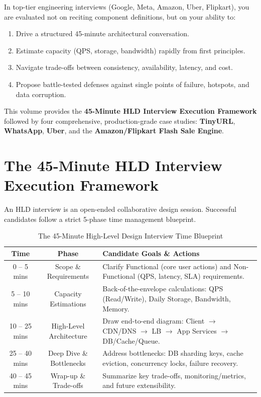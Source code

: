 \documentclass[10pt,journal,compsoc,onecolumn]{IEEEtran}
\begin{document}
In top-tier engineering interviews (Google, Meta, Amazon, Uber, Flipkart), you are evaluated not on reciting component definitions, but on your ability to:
\begin{enumerate}
    \item Drive a structured 45-minute architectural conversation.
    \item Estimate capacity (QPS, storage, bandwidth) rapidly from first principles.
    \item Navigate trade-offs between consistency, availability, latency, and cost.
    \item Propose battle-tested defenses against single points of failure, hotspots, and data corruption.
\end{enumerate}

This volume provides the \textbf{45-Minute HLD Interview Execution Framework} followed by four comprehensive, production-grade case studies: \textbf{TinyURL}, \textbf{WhatsApp}, \textbf{Uber}, and the \textbf{Amazon/Flipkart Flash Sale Engine}.

\section{The 45-Minute HLD Interview Execution Framework}
\label{sec:hld_framework}

An HLD interview is an open-ended collaborative design session. Successful candidates follow a strict 5-phase time management blueprint.

\begin{table}[htbp]
\caption{The 45-Minute High-Level Design Interview Time Blueprint}
\label{tab:hld_blueprint}
\centering
\begin{tabular}{ccl}
\toprule
\textbf{Time} & \textbf{Phase} & \textbf{Candidate Goals \& Actions} \\
\midrule
0 -- 5 mins & Scope \& Requirements & Clarify Functional (core user actions) and Non-Functional (QPS, latency, SLA) requirements. \\
5 -- 10 mins & Capacity Estimations & Back-of-the-envelope calculations: QPS (Read/Write), Daily Storage, Bandwidth, Memory. \\
10 -- 25 mins & High-Level Architecture & Draw end-to-end diagram: Client $\to$ CDN/DNS $\to$ LB $\to$ App Services $\to$ DB/Cache/Queue. \\
25 -- 40 mins & Deep Dive \& Bottlenecks & Address bottlenecks: DB sharding keys, cache eviction, concurrency locks, failure recovery. \\
40 -- 45 mins & Wrap-up \& Trade-offs & Summarize key trade-offs, monitoring/metrics, and future extensibility. \\
\bottomrule
\end{tabular}
\end{table}
\end{document}
